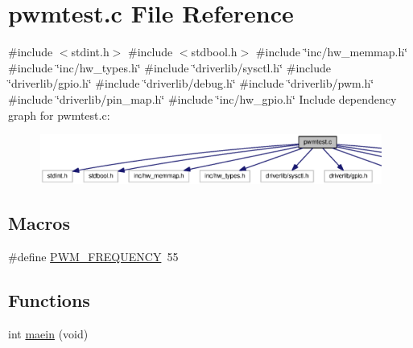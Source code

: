 \section{pwmtest.\+c File Reference}
\label{pwmtest_8c}
{\ttfamily \#include $<$stdint.\+h$>$}\newline
{\ttfamily \#include $<$stdbool.\+h$>$}\newline
{\ttfamily \#include \char`\"{}inc/hw\+\_\+memmap.\+h\char`\"{}}\newline
{\ttfamily \#include \char`\"{}inc/hw\+\_\+types.\+h\char`\"{}}\newline
{\ttfamily \#include \char`\"{}driverlib/sysctl.\+h\char`\"{}}\newline
{\ttfamily \#include \char`\"{}driverlib/gpio.\+h\char`\"{}}\newline
{\ttfamily \#include \char`\"{}driverlib/debug.\+h\char`\"{}}\newline
{\ttfamily \#include \char`\"{}driverlib/pwm.\+h\char`\"{}}\newline
{\ttfamily \#include \char`\"{}driverlib/pin\+\_\+map.\+h\char`\"{}}\newline
{\ttfamily \#include \char`\"{}inc/hw\+\_\+gpio.\+h\char`\"{}}\newline
Include dependency graph for pwmtest.\+c\+:
\nopagebreak
\begin{figure}[H]
\begin{center}
\leavevmode
\includegraphics[width=350pt]{pwmtest_8c__incl}
\end{center}
\end{figure}
\subsection*{Macros}
\begin{DoxyCompactItemize}
\item 
\#define \mbox{\hyperlink{pwmtest_8c_a6177eb86ee16a1956c81749e4e332cf0}{P\+W\+M\+\_\+\+F\+R\+E\+Q\+U\+E\+N\+CY}}~55
\end{DoxyCompactItemize}
\subsection*{Functions}
\begin{DoxyCompactItemize}
\item 
int \mbox{\hyperlink{pwmtest_8c_a318e1cba2e294d6cc5be9f5eb176644b}{maein}} (void)
\end{DoxyCompactItemize}


